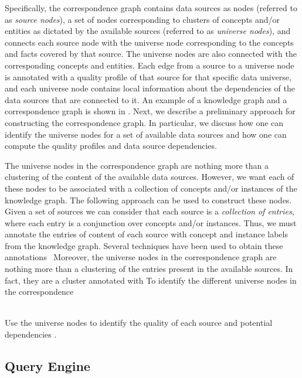 \documentclass{sig-alternate}
\begin{document}
Specifically, the correspondence graph contains data sources as nodes (referred to as {\em source nodes}), a set of nodes corresponding to clusters of concepts and/or entities as dictated by the available sources (referred to as {\em universe nodes}), and connects each source node with the universe node corresponding to the concepts and facts covered by that source. The universe nodes are also connected with the corresponding concepts and entities.  Each edge from a source to a universe node is annotated with a quality profile of that source for that specific data universe, and each universe node contains local information about the dependencies of the data sources that are connected to it. An example of a knowledge graph and a correspondence graph is shown in . Next, we describe a preliminary approach for constructing the correspondence graph. In particular, we discuss how one can identify the universe nodes for a set of available data sources and how one can compute the quality profiles and data source dependencies. 


The universe nodes in the correspondence graph are nothing more than a clustering of the content of the available data sources. However, we want each of these nodes to be associated with a collection of concepts and/or instances of the knowledge graph. The following approach can be used to construct these nodes. Given a set of sources we can consider that each source is a {\em collection of entries}, where each entry is a conjunction over concepts and/or instances. Thus, we must annotate the entries of content of each source with concept and instance labels from the knowledge graph. Several techniques have been used to obtain these annotations~\cite{limaye:2010, }  Moreover, the universe nodes in the correspondence graph are nothing more than a clustering of the entries present in the available sources. In fact, they are a cluster annotated with To identify the different universe nodes in the correspondence 

\ \\Use the universe nodes to identify the quality of each source and potential dependencies . 


\subsection{Query Engine}
\end{document}
